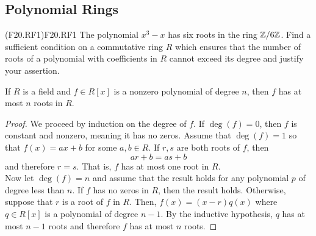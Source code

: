 \documentclass[../AlgebraQualSolutions.tex]{subfiles}
\begin{document}
\subsection{Polynomial Rings}

\begin{prob}{(F20.RF1)}{F20.RF1}
    The polynomial $x^3 - x$ has six roots in the ring $\mathbb{Z}/6\mathbb{Z}$. Find a sufficient condition on a commutative ring $R$ which ensures that the number of roots of a polynomial with coefficients in $R$ cannot exceed its degree and justify your assertion.
    \end{prob}
    
    \begin{claim}
        If $R$ is a field and $f \in R[x]$ is a nonzero polynomial of degree $n$, then $f$ has at most $n$ roots in $R$.
    
        \begin{proof}
            We proceed by induction on the degree of $f$. If $\deg(f) = 0$, then $f$ is constant and nonzero, meaning it has no zeros. Assume that $\deg(f) = 1$ so that $f(x) = ax + b$ for some $a,b \in R$. If $r,s$ are both roots of $f$, then
                \[ar + b = as + b\]
            and therefore $r = s$. That is, $f$ has at most one root in $R$.\\
            
            Now let $\deg(f) = n$ and assume that the result holds for any polynomial $p$ of degree less than $n$. If $f$ has no zeros in $R$, then the result holds. Otherwise, suppose that $r$ is a root of $f$ in $R$. Then, $f(x) = (x - r)q(x)$ where $q \in R[x]$ is a polynomial of degree $n - 1$. By the inductive hypothesis, $q$ has at most $n - 1$ roots and therefore $f$ has at most $n$ roots.
        \end{proof}
    \end{claim}
\end{document}
